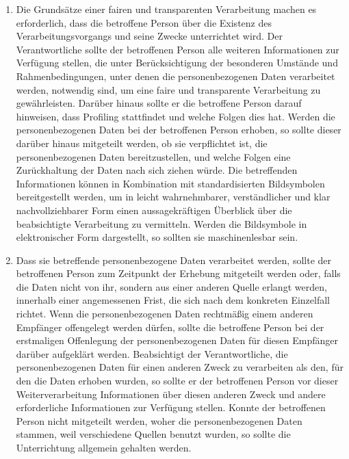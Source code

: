 \begin{enumerate}

   \item Die Grundsätze einer fairen und transparenten Verarbeitung machen es erforderlich, dass die betroffene Person
    über die Existenz des Verarbeitungsvorgangs und seine Zwecke unterrichtet wird. Der Verantwortliche sollte der
    betroffenen Person alle weiteren Informationen zur Verfügung stellen, die unter Berücksichtigung der besonderen
    Umstände und Rahmenbedingungen, unter denen die personenbezogenen Daten verarbeitet werden, notwendig sind, um eine
    faire und transparente Verarbeitung zu gewährleisten. Darüber hinaus sollte er die betroffene Person darauf
    hinweisen, dass Profiling stattfindet und welche Folgen dies hat. Werden die personenbezogenen Daten bei der
    betroffenen Person erhoben, so sollte dieser darüber hinaus mitgeteilt werden, ob sie verpflichtet ist, die
    personenbezogenen Daten bereitzustellen, und welche Folgen eine Zurückhaltung der Daten nach sich ziehen würde. Die
    betreffenden Informationen können in Kombination mit standardisierten Bildsymbolen bereitgestellt werden, um in
    leicht wahrnehmbarer, verständlicher und klar nachvollziehbarer Form einen aussagekräftigen Überblick über die
    beabsichtigte Verarbeitung zu vermitteln. Werden die Bildsymbole in elektronischer Form dargestellt, so sollten sie
    maschinenlesbar sein.%
   \label{eg:60}
   

   \item Dass sie betreffende personenbezogene Daten verarbeitet werden, sollte der betroffenen Person zum Zeitpunkt der
    Erhebung mitgeteilt werden oder, falls die Daten nicht von ihr, sondern aus einer anderen Quelle erlangt werden,
    innerhalb einer angemessenen Frist, die sich nach dem konkreten Einzelfall richtet. Wenn die personenbezogenen
    Daten rechtmäßig einem anderen Empfänger offengelegt werden dürfen, sollte die betroffene Person bei der
    erstmaligen Offenlegung der personenbezogenen Daten für diesen Empfänger darüber aufgeklärt werden. Beabsichtigt
    der Verantwortliche, die personenbezogenen Daten für einen anderen Zweck zu verarbeiten als den, für den die Daten
    erhoben wurden, so sollte er der betroffenen Person vor dieser Weiterverarbeitung Informationen über diesen anderen
    Zweck und andere erforderliche Informationen zur Verfügung stellen. Konnte der betroffenen Person nicht mitgeteilt
    werden, woher die personenbezogenen Daten stammen, weil verschiedene Quellen benutzt wurden, so sollte die
    Unterrichtung allgemein gehalten werden.%
   \label{eg:61}
   

\end{enumerate}
